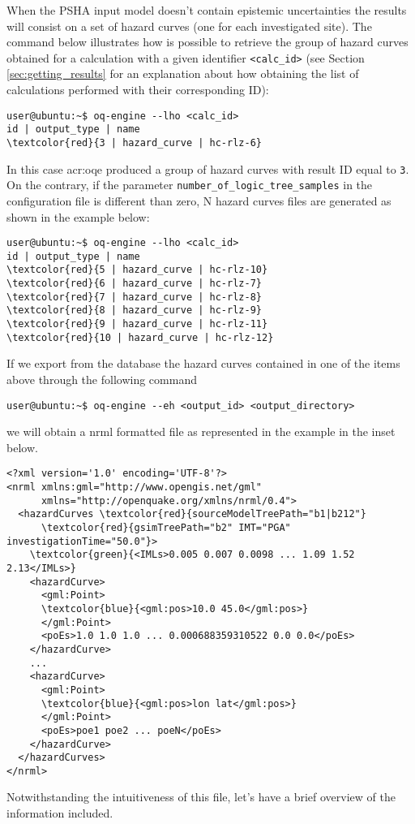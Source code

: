 When the PSHA input model doesn't contain epistemic uncertainties
the results will consist on a set of hazard curves (one for each 
investigated site). 
The command below illustrates how is possible to retrieve the group
of hazard curves obtained for a calculation with a given
identifier \texttt{<calc\_id>} (see Section \ref{sec:getting_results}
for an explanation about how obtaining the list of calculations 
performed with their corresponding ID):
\begin{Verbatim}[frame=single, commandchars=\\\{\}, fontsize=\small]
user@ubuntu:~$ oq-engine --lho <calc_id>
id | output_type | name
\textcolor{red}{3 | hazard_curve | hc-rlz-6}
\end{Verbatim}
In this case \gls{acr:oqe} produced a group of hazard curves with 
result ID equal to \texttt{3}.
% 
On the contrary, if the parameter \texttt{number\_of\_logic\_tree\_samples}
in the configuration file is different than zero, N hazard curves files are generated as shown in the example below:
\begin{Verbatim}[frame=single, commandchars=\\\{\}, fontsize=\small]
user@ubuntu:~$ oq-engine --lho <calc_id>
id | output_type | name
\textcolor{red}{5 | hazard_curve | hc-rlz-10}
\textcolor{red}{6 | hazard_curve | hc-rlz-7}
\textcolor{red}{7 | hazard_curve | hc-rlz-8}
\textcolor{red}{8 | hazard_curve | hc-rlz-9}
\textcolor{red}{9 | hazard_curve | hc-rlz-11}
\textcolor{red}{10 | hazard_curve | hc-rlz-12}
\end{Verbatim}
If we export from the database the hazard curves contained in 
one of the items above through the following command
\begin{Verbatim}[frame=single, commandchars=\\\{\}, fontsize=\small]
user@ubuntu:~$ oq-engine --eh <output_id> <output_directory>
\end{Verbatim}
we will obtain a nrml formatted file as represented in the example
in the inset below.
\begin{Verbatim}[frame=single, commandchars=\\\{\}, fontsize=\small]
<?xml version='1.0' encoding='UTF-8'?>
<nrml xmlns:gml="http://www.opengis.net/gml" 
      xmlns="http://openquake.org/xmlns/nrml/0.4">
  <hazardCurves \textcolor{red}{sourceModelTreePath="b1|b212"} 
      \textcolor{red}{gsimTreePath="b2" IMT="PGA" investigationTime="50.0"}>
    \textcolor{green}{<IMLs>0.005 0.007 0.0098 ... 1.09 1.52 2.13</IMLs>}
    <hazardCurve>
      <gml:Point>
      \textcolor{blue}{<gml:pos>10.0 45.0</gml:pos>}
      </gml:Point>
      <poEs>1.0 1.0 1.0 ... 0.000688359310522 0.0 0.0</poEs>
    </hazardCurve>
    ...
    <hazardCurve>
      <gml:Point>
      \textcolor{blue}{<gml:pos>lon lat</gml:pos>}
      </gml:Point>
      <poEs>poe1 poe2 ... poeN</poEs>
    </hazardCurve>
  </hazardCurves>
</nrml>
\end{Verbatim}
Not\-with\-stand\-ing the intuitiveness of this file, let's have a brief 
overview of the information included.

